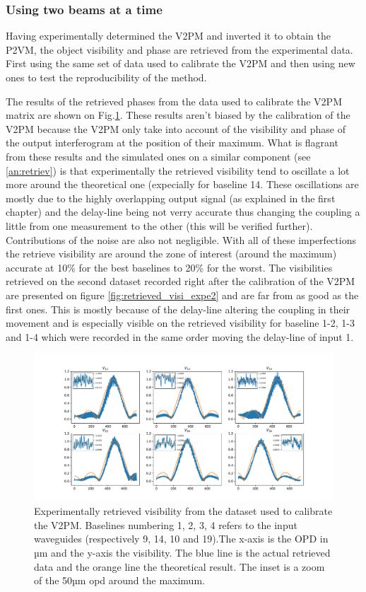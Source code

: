 
\subsubsection{Using two beams at a time}
Having experimentally determined the V2PM and inverted it to obtain the P2VM, the object visibility and phase are retrieved from the experimental  data. First using the same set of data used to calibrate the V2PM and then using new ones to test the reproducibility of the method. 

The results of the retrieved phases from the data used to calibrate the V2PM matrix are shown on Fig.\ref{fig:retrieved_visi_expe}. These results aren't biased by the calibration of the V2PM because the V2PM only take into account of the visibility and phase of the output interferogram at the position of their maximum. What is flagrant from these results and the simulated ones on a similar component (see \ref{an:retriev}) is that experimentally the retrieved visibility tend to oscillate a lot more around the theoretical one (expecially for baseline 14. These oscillations are mostly due to the highly overlapping output signal (as explained in the first chapter) and the delay-line being not verry accurate thus changing the coupling a little from one measurement to the other (this will be verified further). Contributions of the noise are also not negligible. With all of these imperfections the retrieve visibility are around the zone of interest (around the maximum) accurate at 10\% for the best baselines to 20\% for the worst. The visibilities retrieved on the second dataset recorded right after the calibration of the V2PM are presented on figure \ref{fig:retrieved_visi_expe2} and are far from as good as the first ones. This is mostly because of the delay-line altering the coupling in their movement and is especially visible on the retrieved visibility for baseline 1-2, 1-3 and 1-4 which were recorded in the same order moving the delay-line of input 1.  


\begin{figure}[htbp!]
 \centering
 \includegraphics[scale=.4]{../picture/retrieve_visi_expe.pdf}
 \caption{Experimentally retrieved visibility from the dataset used to calibrate the V2PM. Baselines numbering 1, 2, 3, 4 refers to the input waveguides (respectively  9, 14, 10 and 19).The x-axis is the OPD in µm and the y-axis the visibility. The blue line is the actual retrieved data and the orange line the theoretical result. The inset is a zoom of the 50µm opd around the maximum. }
 \label{fig:retrieved_visi_expe}
\end{figure}

